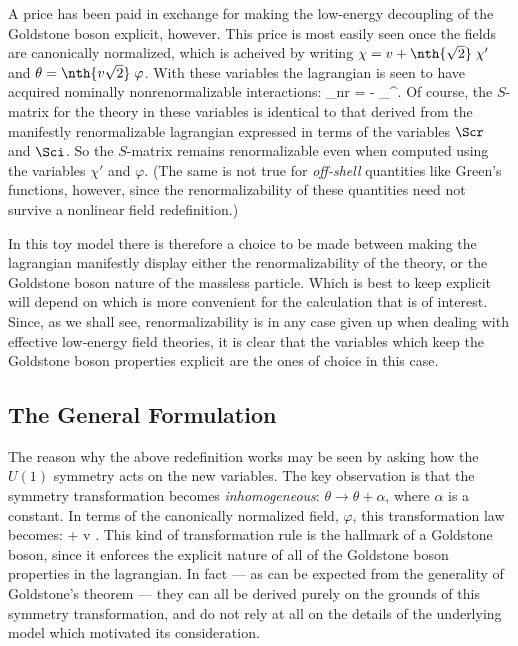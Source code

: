 \documentclass[12pt,epsf]{report}
\begin{document}
A price has been paid in exchange for making the low-energy
decoupling of the Goldstone boson explicit, however. This
price is most easily seen once the fields are canonically
normalized, which is acheived by writing $\chi = v +
\nth{\sqrt{2}} \; \chi'$ and 
$\theta = \nth{v \sqrt{2}} \; \varphi$. With these
variables the lagrangian is seen to have acquired nominally
nonrenormalizable interactions:
%
\eq
\label{nrints}
\Scl_{\rm nr} = -  \; \partial_\mu \varphi \partial^\mu \varphi. \eeq
%
Of course, the $S$-matrix for the theory in these variables
is identical to that derived from the manifestly
renormalizable lagrangian expressed in terms of the
variables $\Scr$ and $\Sci$. So the $S$-matrix remains
renormalizable even when computed using the variables
$\chi'$ and $\varphi$. (The same is not true for {\em
off-shell} quantities like Green's functions, however,
since the renormalizability of these quantities need not
survive a nonlinear field redefinition.)

In this toy model there is therefore a choice to be made
between making the lagrangian manifestly display either the
renormalizability of the theory, or the Goldstone boson
nature of the massless particle. Which is best to keep
explicit will depend on which is more convenient for the
calculation that is of interest. Since, as we shall see,
renormalizability is in any case given up when dealing with
effective low-energy field theories, it is clear that the
variables which keep the Goldstone boson properties
explicit are the ones of choice in this case.

\subsection{The General Formulation}

The reason why the above redefinition works may be seen by
asking how the $U(1)$ symmetry acts on the new variables.
The key observation is that the symmetry  transformation
becomes 
{\em inhomogeneous}: $\theta \to \theta + \alpha$, where 
$\alpha$ is a constant. In terms of the canonically
normalized field, $\varphi$, this transformation law
becomes:
%
\eq
\label{gbabeltransf}
\varphi \to \varphi +  \; v \; \alpha. \eeq
%
This kind of transformation rule is the hallmark of a
Goldstone boson, since it enforces the explicit nature of
all of the Goldstone boson properties in the lagrangian. In
fact --- as can be expected from the generality of
Goldstone's theorem --- they can all be derived purely on
the grounds of this symmetry transformation, and do not
rely at all on the details of the underlying model which
motivated its consideration.
\end{document}
